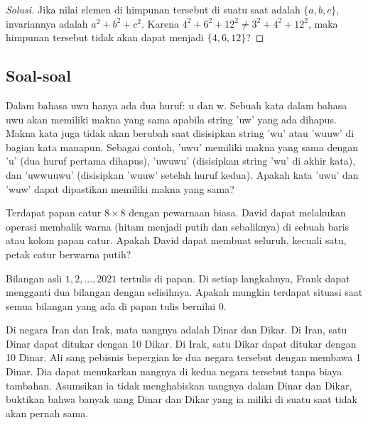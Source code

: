 \documentclass[11pt]{scrartcl}
\begin{document}
\begin{proof}[Solusi]
    Jika nilai elemen di himpunan tersebut di suatu saat adalah $\{a,b,c\}$, invariannya adalah $a^2 + b^2 + c^2$. Karena $4^2 + 6^2 + 12^2 \neq 3^2 + 4^2 + 12^2$, maka himpunan tersebut tidak akan dapat menjadi $\{4, 6, 12\}$?
\end{proof}

\subsection{Soal-soal}
\begin{problem}
    Dalam bahasa uwu hanya ada dua huruf: u dan w. Sebuah kata dalam bahasa uwu akan memiliki makna yang sama apabila string 'uw' yang ada dihapus. Makna kata juga tidak akan berubah saat disisipkan string 'wu' atau 'wuuw' di bagian kata manapun. Sebagai contoh, 'uwu' memiliki makna yang sama dengan 'u' (dua huruf pertama dihapus), 'uwuwu' (disisipkan string 'wu' di akhir kata), dan 'uwwuuwu' (disisipkan 'wuuw' setelah huruf kedua). Apakah kata 'uwu' dan 'wuw' dapat dipastikan memiliki makna yang sama?
\end{problem}

\begin{problem}
    Terdapat papan catur $8 \times 8$ dengan pewarnaan biasa. David dapat melakukan operasi membalik warna (hitam menjadi putih dan sebaliknya) di sebuah baris atau kolom papan catur. Apakah David dapat membuat seluruh, kecuali satu, petak catur berwarna putih?
\end{problem}

\begin{problem}
    Bilangan asli $1, 2, ..., 2021$ tertulis di papan. Di setiap langkahnya, Frank dapat mengganti dua bilangan dengan selisihnya. Apakah mungkin terdapat situasi saat semua bilangan yang ada di papan tulis bernilai $0$.
\end{problem}

\begin{problem}
    Di negara Iran dan Irak, mata uangnya adalah Dinar dan Dikar. Di Iran, satu Dinar dapat ditukar dengan 10 Dikar. Di Irak, satu Dikar dapat ditukar dengan 10 Dinar. Ali sang pebisnis bepergian ke dua negara tersebut dengan membawa 1 Dinar. Dia dapat menukarkan uangnya di kedua negara tersebut tanpa biaya tambahan. Asumsikan ia tidak menghabiskan uangnya dalam Dinar dan Dikar, buktikan bahwa banyak uang Dinar dan Dikar yang ia miliki di suatu saat tidak akan pernah sama.
\end{problem}
\end{document}

